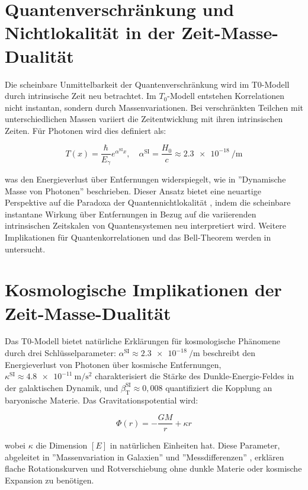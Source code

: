 \documentclass[a4paper,12pt]{article}
\newcommand{\Tfield}{T(x)}
\newcommand{\betaT}{\beta_{\text{T}}}
\begin{document}
	\section{Quantenverschränkung und Nichtlokalität in der Zeit-Masse-Dualität}
	
	Die scheinbare Unmittelbarkeit der Quantenverschränkung wird im T0-Modell durch intrinsische Zeit neu betrachtet. Im \(T_0\)-Modell entstehen Korrelationen nicht instantan, sondern durch Massenvariationen. Bei verschränkten Teilchen mit unterschiedlichen Massen variiert die Zeitentwicklung mit ihren intrinsischen Zeiten. Für Photonen wird dies definiert als:
	
	\begin{equation}
		\Tfield = \frac{\hbar}{E_{\gamma}} e^{\alpha^{\text{SI}} x}, \quad \alpha^{\text{SI}} = \frac{H_0}{c} \approx \SI{2,3e-18}{\per\meter}
	\end{equation}
	
	was den Energieverlust über Entfernungen widerspiegelt, wie in ''Dynamische Masse von Photonen'' \cite{pascher_photons_2025} beschrieben. Dieser Ansatz bietet eine neuartige Perspektive auf die Paradoxa der Quantennichtlokalität \cite{bell1964}, indem die scheinbare instantane Wirkung über Entfernungen in Bezug auf die variierenden intrinsischen Zeitskalen von Quantensystemen neu interpretiert wird. Weitere Implikationen für Quantenkorrelationen und das Bell-Theorem werden in \cite{pascher_feldtheorie_2025} untersucht.
	
	\section{Kosmologische Implikationen der Zeit-Masse-Dualität}
	
	Das T0-Modell bietet natürliche Erklärungen für kosmologische Phänomene durch drei Schlüsselparameter: \(\alpha^{\text{SI}} \approx \SI{2,3e-18}{\per\meter}\) beschreibt den Energieverlust von Photonen über kosmische Entfernungen, \(\kappa^{\text{SI}} \approx \SI{4,8e-11}{\meter\per\second\squared}\) charakterisiert die Stärke des Dunkle-Energie-Feldes in der galaktischen Dynamik, und \(\betaT^{\text{SI}} \approx 0,008\) quantifiziert die Kopplung an baryonische Materie. Das Gravitationspotential wird:
	
	\begin{equation}
		\Phi(r) = -\frac{G M}{r} + \kappa r
	\end{equation}
	
	wobei \(\kappa\) die Dimension \([E]\) in natürlichen Einheiten hat. Diese Parameter, abgeleitet in ''Massenvariation in Galaxien'' \cite{pascher_galaxies_2025} und ''Messdifferenzen'' \cite{pascher_messdifferenzen_2025}, erklären flache Rotationskurven und Rotverschiebung ohne dunkle Materie oder kosmische Expansion zu benötigen.
	
\end{document}
